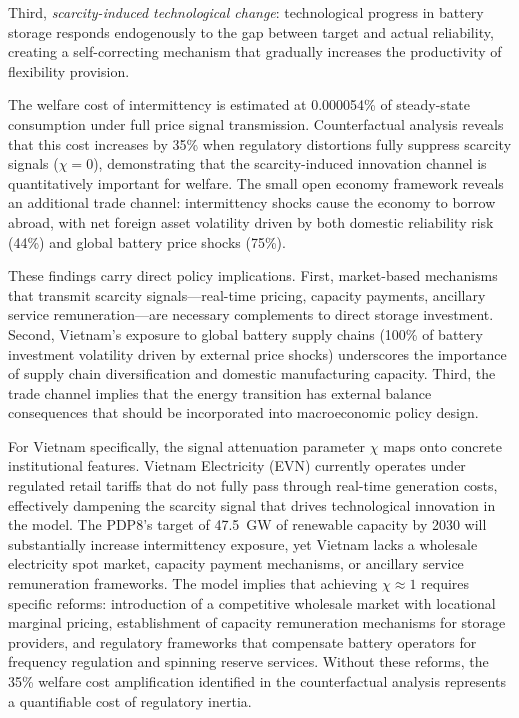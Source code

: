 \documentclass[12pt, a4paper]{article}
\begin{document}
Third, \textit{scarcity-induced technological change}: technological progress in battery storage responds endogenously to the gap between target and actual reliability, creating a self-correcting mechanism that gradually increases the productivity of flexibility provision.

The welfare cost of intermittency is estimated at 0.000054\% of steady-state consumption under full price signal transmission. Counterfactual analysis reveals that this cost increases by 35\% when regulatory distortions fully suppress scarcity signals ($\chi = 0$), demonstrating that the scarcity-induced innovation channel is quantitatively important for welfare. The small open economy framework reveals an additional trade channel: intermittency shocks cause the economy to borrow abroad, with net foreign asset volatility driven by both domestic reliability risk (44\%) and global battery price shocks (75\%).

These findings carry direct policy implications. First, market-based mechanisms that transmit scarcity signals---real-time pricing, capacity payments, ancillary service remuneration---are necessary complements to direct storage investment. Second, Vietnam's exposure to global battery supply chains (100\% of battery investment volatility driven by external price shocks) underscores the importance of supply chain diversification and domestic manufacturing capacity. Third, the trade channel implies that the energy transition has external balance consequences that should be incorporated into macroeconomic policy design.

For Vietnam specifically, the signal attenuation parameter $\chi$ maps onto concrete institutional features. Vietnam Electricity (EVN) currently operates under regulated retail tariffs that do not fully pass through real-time generation costs, effectively dampening the scarcity signal that drives technological innovation in the model. The PDP8's target of 47.5~GW of renewable capacity by 2030 will substantially increase intermittency exposure, yet Vietnam lacks a wholesale electricity spot market, capacity payment mechanisms, or ancillary service remuneration frameworks. The model implies that achieving $\chi \approx 1$ requires specific reforms: introduction of a competitive wholesale market with locational marginal pricing, establishment of capacity remuneration mechanisms for storage providers, and regulatory frameworks that compensate battery operators for frequency regulation and spinning reserve services. Without these reforms, the 35\% welfare cost amplification identified in the counterfactual analysis represents a quantifiable cost of regulatory inertia.
\end{document}
